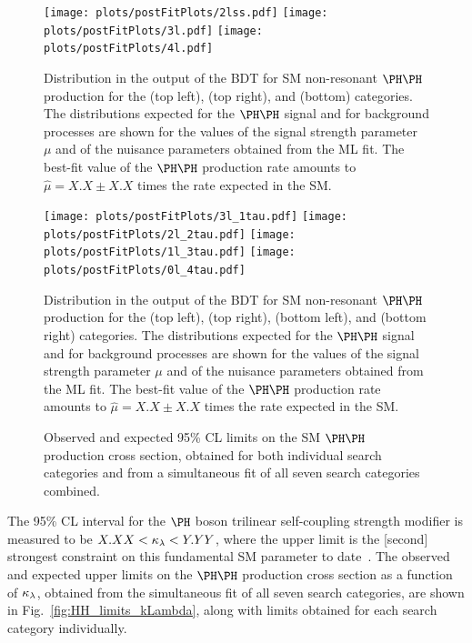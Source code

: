 \begin{figure}
  \centering\texttt{[image: plots/postFitPlots/2lss.pdf]}
  \centering\texttt{[image: plots/postFitPlots/3l.pdf]}
  \centering\texttt{[image: plots/postFitPlots/4l.pdf]}
  \caption{
    Distribution in the output of the BDT for SM non-resonant $\HH$ production
    for the \llss (top left), \lllnot (top right), and \llll (bottom) categories.
    The distributions expected for the $\HH$ signal and for background processes
    are shown for the values of the signal strength parameter $\mu$ 
    and of the nuisance parameters obtained from the ML fit.
    The best-fit value of the $\HH$ production rate amounts to $\hat{\mu} = X.X \pm X.X$ 
    times the rate expected in the SM.
  }
  \label{fig:postfitPlots1}
\end{figure}

\begin{figure}
  \centering\texttt{[image: plots/postFitPlots/3l\_1tau.pdf]}
  \centering\texttt{[image: plots/postFitPlots/2l\_2tau.pdf]}
  \centering\texttt{[image: plots/postFitPlots/1l\_3tau.pdf]}
  \centering\texttt{[image: plots/postFitPlots/0l\_4tau.pdf]}
  \caption{
    Distribution in the output of the BDT for SM non-resonant $\HH$ production
    for the \lllt (top left), \lltt (top right), \lttt (bottom left), and \noltttt (bottom right) categories.
    The distributions expected for the $\HH$ signal and for background processes
    are shown for the values of the signal strength parameter $\mu$ 
    and of the nuisance parameters obtained from the ML fit.
    The best-fit value of the $\HH$ production rate amounts to $\hat{\mu} = X.X \pm X.X$ 
    times the rate expected in the SM.
  }
  \label{fig:postfitPlots2}
\end{figure}

\begin{figure}
  \centering
  \caption{
    Observed and expected 95\% CL limits on the SM $\HH$ production cross section,
    obtained for both individual search categories
    and from a simultaneous fit of all seven search categories combined.
  }
  \label{fig:HH_limits_SM}
\end{figure}

The 95\% CL interval for the $\PHiggs$ boson trilinear self-coupling strength modifier
is measured to be $X.XX < \kappa_{\lambda} < Y.YY$, where the upper limit is the [second]
strongest constraint on this fundamental SM parameter to date~\cite{Sirunyan:2745738,Sirunyan:2018ayu,2020135103}.
The observed and expected upper limits on the $\HH$ production cross section as a function of
$\kappa_{\lambda}$, obtained from the simultaneous fit of all seven search categories, are shown in Fig.~\ref{fig:HH_limits_kLambda}, 
along with limits obtained for each search category individually.

